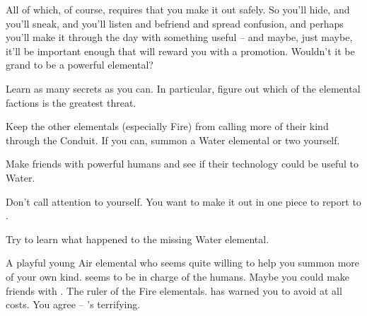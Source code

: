 \documentclass[char]{elementals}
\begin{document}
All of which, of course, requires that you make it out safely. So you'll hide, and you'll sneak, and you'll listen and befriend and spread confusion, and perhaps you'll make it through the day with something useful -- and maybe, just maybe, it'll be important enough that \cWaterQueen{} will reward you with a promotion. Wouldn't it be grand to be a powerful elemental?

\begin{itemz}[Goals]
	\item  Learn as many secrets as you can. In particular, figure out which of the elemental factions is the greatest threat.
	\item  Keep the other elementals (especially Fire) from calling more of their kind through the Conduit. If you can, summon a Water elemental or two yourself.
	\item  Make friends with powerful humans and see if their technology could be useful to Water.
	\item  Don't call attention to yourself. You want to make it out in one piece to report to \cWaterQueen{}.
	\item  Try to learn what happened to the missing Water elemental.
\end{itemz}

\begin{contacts}
	\contact{\cMiniAir{\intro}} A playful young Air elemental who seems quite willing to help you summon more of your own kind.
	\contact{\cLeader{\intro}} \cLeader{\They} seems to be in charge of the humans. Maybe you could make friends with \cLeader{\them}.
  \contact{\cQueen{\intro}} The ruler of the Fire elementals. \cWaterQueen{} has warned you to avoid \cQueen{\them} at all costs. You agree -- \cQueen{\they}'s terrifying.
\end{contacts} 
\end{document}
